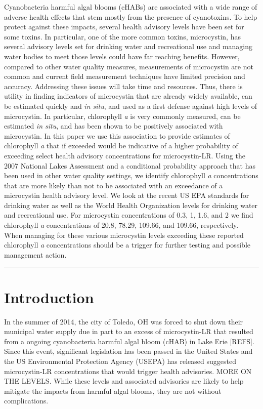 \documentclass[11pt,]{article}
\begin{document}
Cyanobacteria harmful algal blooms (cHABs) are associated with a wide
range of adverse health effects that stem mostly from the presence of
cyanotoxins. To help protect against these impacts, several health
advisory levels have been set for some toxins. In particular, one of the
more common toxins, microcystin, has several advisory levels set for
drinking water and recreational use and managing water bodies to meet
those levels could have far reaching benefits. However, compared to
other water quality measures, measurements of microcystin are not common
and current field measurement techniques have limited precision and
accuracy. Addressing these issues will take time and resources. Thus,
there is utility in finding indicators of microcystin that are already
widely available, can be estimated quickly and \emph{in situ}, and used
as a first defense against high levels of microcystin. In particular,
chlorophyll \emph{a} is very commonly measured, can be estimated
\emph{in situ}, and has been shown to be positively associated with
microcystin. In this paper we use this association to provide estimates
of chlorophyll \emph{a} that if exceeded would be indicative of a higher
probability of exceeding select health advisory concentrations for
microcystin-LR. Using the 2007 National Lakes Assessment and a
conditional probability approach that has been used in other water
quality settings, we identify chlorophyll \emph{a} concentrations that
are more likely than not to be associated with an exceedance of a
microcystin health advisory level. We look at the recent US EPA
standards for drinking water as well as the World Health Organization
levels for drinking water and recreational use. For microcystin
concentrations of 0.3, 1, 1.6, and 2 we find chlorophyll \emph{a}
concentrations of 20.8, 78.29, 109.66, and 109.66, respectively. When
managing for these various microcystin levels exceeding these reported
chlorophyll \emph{a} concentrations should be a trigger for further
testing and possible management action.

\vspace{3mm}

\hrule

\doublespace

\section{Introduction}\label{introduction}

In the summer of 2014, the city of Toledo, OH was forced to shut down
their municipal water supply due in part to an excess of microcystin-LR
that resulted from a ongoing cyanobacteria harmful algal bloom (cHAB) in
Lake Erie {[}REFS{]}. Since this event, significant legislation has been
passed in the United States and the US Environmental Protection Agency
(USEPA) has released suggested microcystin-LR concentrations that would
trigger health advisories. MORE ON THE LEVELS. While these levels and
associated advisories are likely to help mitigate the impacts from
harmful algal blooms, they are not without complications.
\end{document}
